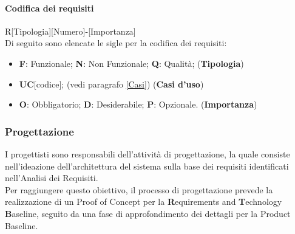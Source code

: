 \paragraph{Codifica dei requisiti}

R[Tipologia][Numero]-[Importanza] \\
Di seguito sono elencate le sigle per la codifica dei requisiti: 
\begin{itemize}
    \item \textbf{F}: Funzionale; \textbf{N}: Non Funzionale; \textbf{Q}: Qualità; (\textbf{Tipologia})
    \item \textbf{UC}[codice]; (vedi paragrafo \ref{Casi}) (\textbf{Casi d'uso})
    \item \textbf{O}: Obbligatorio; \textbf{D}: Desiderabile; \textbf{P}: Opzionale. (\textbf{Importanza})
\end{itemize}

\subsubsection{Progettazione} 
I progettisti sono responsabili dell'attività di progettazione, la quale consiste nell'ideazione dell'architettura del sistema sulla base dei requisiti 
identificati nell'Analisi dei Requisiti. \\
Per raggiungere questo obiettivo, il processo di progettazione prevede la realizzazione di un Proof of Concept\glo 
per la \textbf{R}equirements and \textbf{T}echnology \textbf{B}aseline, seguito da una fase di approfondimento dei dettagli per la Product Baseline.

